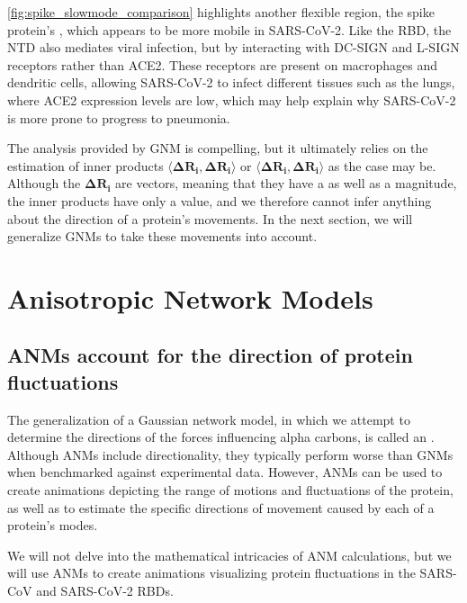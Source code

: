 \autoref{fig:spike_slowmode_comparison} highlights another flexible region, the spike protein's , which appears to be more mobile in SARS-CoV-2. Like the RBD, the NTD also mediates viral infection, but by interacting with DC-SIGN and L-SIGN receptors rather than ACE2. These receptors are present on macrophages and dendritic cells, allowing SARS-CoV-2 to infect different tissues such as the lungs, where ACE2 expression levels are low, which may help explain why SARS-CoV-2 is more prone to progress to pneumonia.

The analysis provided by GNM is compelling, but it ultimately relies on the estimation of inner products $ \langle \mathbf{\Delta R_i}, \mathbf{\Delta R_i} \rangle $ or $ \langle \mathbf{\Delta R_i}, \mathbf{\Delta R_i} \rangle $ as the case may be. Although the $ \mathbf{\Delta R_i} $ are vectors, meaning that they have a  as well as a magnitude, the inner products have only a value, and we therefore cannot infer anything about the direction of a protein's movements. In the next section, we will generalize GNMs to take these movements into account.\\

\FloatBarrier
{}
\section{Anisotropic Network Models}

\FloatBarrier
{}
\subsection{ANMs account for the direction of protein fluctuations}

The generalization of a Gaussian network model, in which we attempt to determine the directions of the forces influencing alpha carbons, is called an . Although ANMs include directionality, they typically perform worse than GNMs when benchmarked against experimental data. However, ANMs can be used to create animations depicting the range of motions and fluctuations of the protein, as well as to estimate the specific directions of movement caused by each of a protein's modes.

We will not delve into the mathematical intricacies of ANM calculations, but we will use ANMs to create animations visualizing protein fluctuations in the SARS-CoV and SARS-CoV-2 RBDs.

